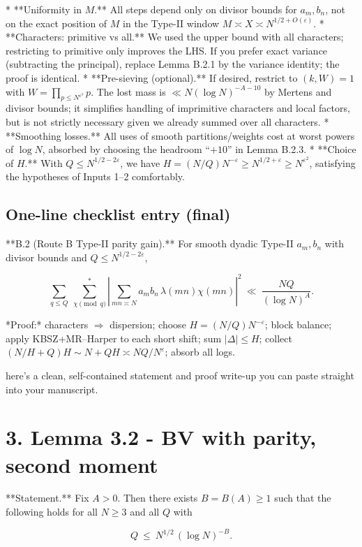 \documentclass[11pt]{article}
\theoremstyle{definition}
\theoremstyle{remark}
\begin{document}
* **Uniformity in $M$.** All steps depend only on divisor bounds for $a_m,b_n$, not on the exact position of $M$ in the Type-II window $M\asymp X\asymp N^{1/2+O(\varepsilon)}$.
* **Characters: primitive vs all.** We used the upper bound with all characters; restricting to primitive only improves the LHS. If you prefer exact variance (subtracting the principal), replace Lemma B.2.1 by the variance identity; the proof is identical.
* **Pre-sieving (optional).** If desired, restrict to $(k,W)=1$ with $W=\prod_{p\le N^{\varepsilon^3}}p$. The lost mass is $\ll N(\log N)^{-A-10}$ by Mertens and divisor bounds; it simplifies handling of imprimitive characters and local factors, but is not strictly necessary given we already summed over all characters.
* **Smoothing losses.** All uses of smooth partitions/weights cost at worst powers of $\log N$, absorbed by choosing the headroom “$+10$” in Lemma B.2.3.
* **Choice of $H$.** With $Q\le N^{1/2-2\varepsilon}$, we have $H=(N/Q)N^{-\varepsilon}\ge N^{1/2+\varepsilon}\ge N^{\varepsilon^2}$, satisfying the hypotheses of Inputs 1–2 comfortably.


\subsection*{One-line checklist entry (final)}

**B.2 (Route B Type-II parity gain).** For smooth dyadic Type-II $a_m,b_n$ with divisor bounds and $Q\le N^{1/2-2\varepsilon}$,

$$
\sum_{q\le Q}\ \sum_{\chi\!\!\!\pmod q}^{\!*}\left|\sum_{mn\asymp N} a_m b_n\,\lambda(mn)\chi(mn)\right|^2
\ \ll\ \frac{NQ}{(\log N)^{A}}.
$$

*Proof:* characters $\Rightarrow$ dispersion; choose $H=(N/Q)N^{-\varepsilon}$; block balance; apply KBSZ+MR–Harper to each short shift; sum $|\Delta|\le H$; collect $(N/H+Q)H\sim N\!+\!QH\asymp NQ/N^{\varepsilon}$; absorb all logs.

here’s a clean, self-contained statement and proof write-up you can paste straight into your manuscript.

\section*{3. Lemma 3.2 - BV with parity, second moment}

**Statement.**
Fix $A>0$. Then there exists $B=B(A)\ge 1$ such that the following holds for all $N\ge 3$ and all $Q$ with

$$
Q\ \le\ N^{1/2}\,(\log N)^{-B}.
$$
\end{document}
